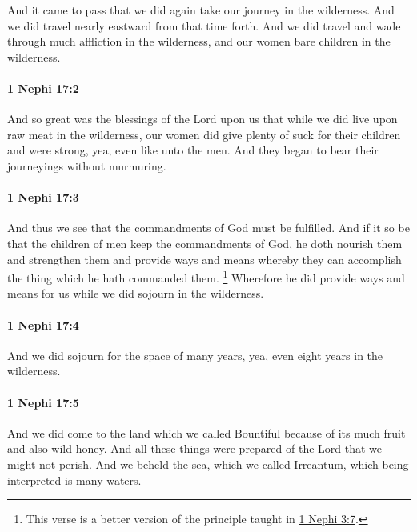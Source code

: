 			And it came to pass that we did again take our journey in the wilderness.
			And we did travel nearly eastward from that time forth.
			And we did travel and wade through much affliction in the wilderness,
			and our women bare children in the wilderness.

		\paragraph{1 Nephi 17:2} %
			\label{1NEPHI-17-2}

			And so great was the blessings of the Lord upon us
			that while we did live upon raw meat in the wilderness,
			our women did give plenty of suck for their children and were strong,
			yea, even like unto the men.
			And they began to bear their journeyings without murmuring.

		\paragraph{1 Nephi 17:3} %
			\label{1NEPHI-17-3}

			And thus we see that the commandments of God must be fulfilled.
			And if it so be that the children of men keep the commandments of God,
			he doth nourish them and strengthen them
			and provide ways and means whereby they can accomplish the thing
			which he hath commanded them.%
			\footnote{%
				\label{1NEPHI-17-3-NOTE-better}%
				This verse is a better version of the principle taught in \hyperref[1NEPHI-3-7]{1 Nephi 3:7}.
				} 
			Wherefore he did provide ways and means for us
			while we did sojourn in the wilderness.

		\paragraph{1 Nephi 17:4} %
			\label{1NEPHI-17-4}

			And we did sojourn for the space of many years,
			yea, even eight years in the wilderness.

		\paragraph{1 Nephi 17:5} %
			\label{1NEPHI-17-5}

			And we did come to the land which we called Bountiful
			because of its much fruit and also wild honey.
			And all these things were prepared of the Lord that we might not perish.
			And we beheld the sea, which we called Irreantum,
			which being interpreted is many waters.

